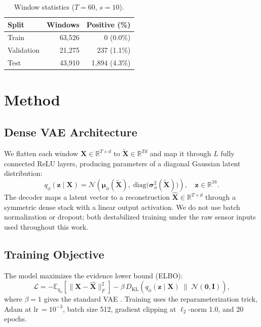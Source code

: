 \documentclass{article}
\newcommand{\hcell}[1]{\textbf{\textcolor{accent!90!black}{#1}}}
\begin{document}
\begin{table}[h]
\centering
\small
\caption{Window statistics ($T = 60$, $s = 10$).}
\label{tab:windows}
\vspace{3pt}
\begin{tabular}{l r r}
\toprule
\rowcolor{tabhead}
\hcell{Split} & \hcell{Windows} & \hcell{Positive (\%)} \\
\midrule
Train      & 63,526 & 0 \hphantom{0}(0.0\%) \\
\rowcolor{tabalt}
Validation & 21,275 & 237 \hphantom{0}(1.1\%) \\
Test       & 43,910 & 1,894 \hphantom{0}(4.3\%) \\
\bottomrule
\end{tabular}
\end{table}
\newpage

\section{Method}

\subsection{Dense VAE Architecture}

We flatten each window $\mathbf{X} \in \mathbb{R}^{T \times d}$ to
$\tilde{\mathbf{X}} \in \mathbb{R}^{Td}$ and map it through $L$ fully connected ReLU
layers, producing parameters of a diagonal Gaussian latent distribution:
\begin{equation}
  q_\phi(\mathbf{z} \mid \mathbf{X})
  = \mathcal{N}\!\left(\boldsymbol{\mu}_\phi(\tilde{\mathbf{X}}),\;
    \mathrm{diag}\bigl(\boldsymbol{\sigma}^2_\phi(\tilde{\mathbf{X}})\bigr)\right),
  \quad \mathbf{z} \in \mathbb{R}^{16}.
\end{equation}
The decoder maps a latent vector to a reconstruction
$\hat{\mathbf{X}} \in \mathbb{R}^{T \times d}$ through a symmetric dense stack with
a linear output activation.
We do not use batch normalization or dropout; both destabilized training under the
raw sensor inputs used throughout this work.

\subsection{Training Objective}

The model maximizes the evidence lower bound (ELBO):
\begin{equation}
  \mathcal{L}
  = -\mathbb{E}_{q_\phi}\!\left[\|\mathbf{X} - \hat{\mathbf{X}}\|_F^2\right]
    - \beta\, D_{\mathrm{KL}}\!\left(q_\phi(\mathbf{z} \mid \mathbf{X}) \;\|\;
      \mathcal{N}(\mathbf{0},\mathbf{I})\right),
\end{equation}
where $\beta = 1$ gives the standard VAE \citep{kingma2014vae}.
Training uses the reparameterization trick, Adam at lr\,$= 10^{-3}$, batch size 512,
gradient clipping at $\ell_2$-norm 1.0, and 20 epochs.
\end{document}

